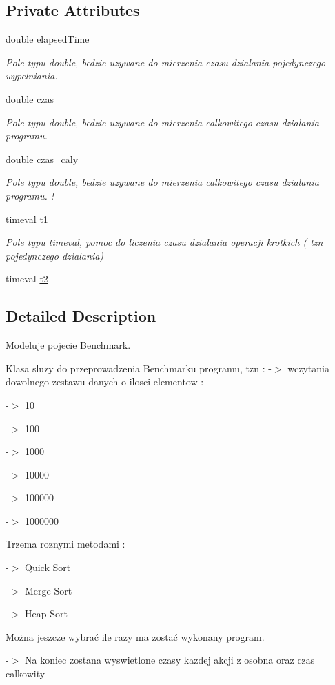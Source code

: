 \subsection*{Private Attributes}
\begin{DoxyCompactItemize}
\item 
double \hyperlink{classbenchmark_a90e6eda0144befd3f3bc1a881904fb57}{elapsed\-Time}
\begin{DoxyCompactList}\small\item\em Pole typu double, bedzie uzywane do mierzenia czasu dzialania pojedynczego wypelniania. \end{DoxyCompactList}\item 
double \hyperlink{classbenchmark_a563b747421276232836b7711b6881ec8}{czas}
\begin{DoxyCompactList}\small\item\em Pole typu double, bedzie uzywane do mierzenia calkowitego czasu dzialania programu. \end{DoxyCompactList}\item 
double \hyperlink{classbenchmark_af677300c0b0a0086f306a0a08a6172b9}{czas\-\_\-caly}
\begin{DoxyCompactList}\small\item\em Pole typu double, bedzie uzywane do mierzenia calkowitego czasu dzialania programu. ! \end{DoxyCompactList}\item 
timeval \hyperlink{classbenchmark_a7789217b36df3b3ae427ceaaa2694d0b}{t1}
\begin{DoxyCompactList}\small\item\em Pole typu timeval, pomoc do liczenia czasu dzialania operacji krotkich ( tzn pojedynczego dzialania) \end{DoxyCompactList}\item 
timeval \hyperlink{classbenchmark_aea9f22e585c0c5826329e48a97a99803}{t2}
\end{DoxyCompactItemize}


\subsection{Detailed Description}
Modeluje pojecie Benchmark. 

Klasa sluzy do przeprowadzenia Benchmarku programu, tzn \-: -\/$>$ wczytania dowolnego zestawu danych o ilosci elementow \-: \par
-\/$>$ 10 \par
-\/$>$ 100 \par
-\/$>$ 1000 \par
-\/$>$ 10000 \par
-\/$>$ 100000 \par
-\/$>$ 1000000 \par
 Trzema roznymi metodami \-: \par
 -\/$>$ Quick Sort \par
 -\/$>$ Merge Sort \par
 -\/$>$ Heap Sort \par
 Można jeszcze wybrać ile razy ma zostać wykonany program. \par
-\/$>$ Na koniec zostana wyswietlone czasy kazdej akcji z osobna oraz czas calkowity 

